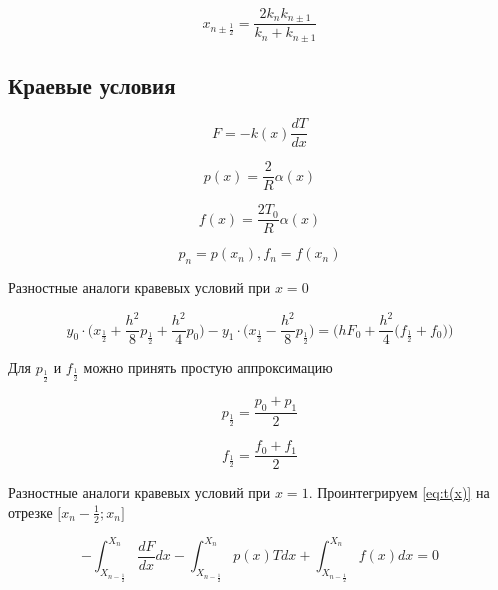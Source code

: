 \begin{equation*}
    x_{n \pm \frac{1}{2}} = \frac{2 k_n k_{n\pm1}}{k_n + k_{n\pm1}}
\end{equation*}

\subsection{Краевые условия}

\begin{equation*}
    F = -k(x)\frac{dT}{dx}
\end{equation*}

\begin{equation*}
    p(x) = \frac{2}{R} \alpha(x)
\end{equation*}

\begin{equation*}
    f(x) = \frac{2T_0}{R} \alpha(x)
\end{equation*}

\begin{equation*}
    p_n = p(x_n), f_n = f(x_n)
\end{equation*}

Разностные аналоги кравевых условий при $x = 0$

\begin{equation}\label{eq:left}
    y_0 \cdot \bigg( x_{\frac{1}{2}} + \frac{h^2}{8} p_{\frac{1}{2}} +
    \frac{h^2}{4}p_0 \bigg) - y_1 \cdot \bigg( x_{\frac{1}{2}} - \frac{h^2}{8}
    p_{\frac{1}{2}} \bigg) = \bigg( hF_0 + \frac{h^2}{4} \big(f_\frac{1}{2}+
    f_0 \big) \bigg)
\end{equation}

Для $p_\frac{1}{2}$ и $f_\frac{1}{2}$ можно принять простую аппроксимацию

\begin{equation*}
    p_\frac{1}{2} = \frac{p_0 + p_1}{2}
\end{equation*}

\begin{equation*}
    f_\frac{1}{2} = \frac{f_0 + f_1}{2}
\end{equation*}

Разностные аналоги кравевых условий при $x = 1$. Проинтегрируем \ref{eq:t(x)} на отрезке $\big[ x_n-\frac{1}{2}; x_n \big]$

\begin{equation*}
    -\int_{X_{n-\frac{1}{2}}}^{X_n} \frac{dF}{dx} dx -
    \int_{X_{n-\frac{1}{2}}}^{X_n} p(x)T dx +
    \int_{X_{n-\frac{1}{2}}}^{X_n} f(x) dx = 0
\end{equation*}

